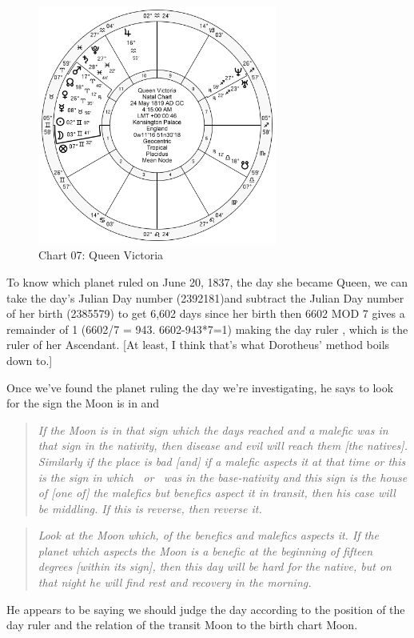 \begin{figure}[H]
\centering
\includegraphics[width=0.7\textwidth]{charts/Victoria.png}
\caption{Chart 07: Queen Victoria}
\end{figure}

To know which planet ruled on June 20, 1837, the day she became Queen, we can take the day's Julian Day number (2392181)\footnotemark[1] and subtract the Julian Day number of her birth (2385579) to get 6,602 days since her birth then 6602 MOD 7 gives a remainder of 1 (6602/7 = 943. 6602-943*7=1) making the day ruler \Mercury, which is the ruler of her Ascendant. [At least, I think that's what Dorotheus' method boils down to.]


Once we've found the planet ruling the day we're investigating, he says to look for the sign the Moon is in and
\begin{quote}
\textsl{If the Moon is in that sign which the days reached and a malefic was in that sign in the nativity, then disease and evil will reach them [the natives]. Similarly if the place is bad [and] if a malefic aspects it at that time or this is the sign in which \Saturn\, or \Mars\, was in the base-nativity and this sign is the house of [one of] the malefics but benefics aspect it in transit, then his case will be middling. If this is reverse, then reverse it.}
\end{quote} 
\begin{quote}
\textsl{Look at the Moon which, of the benefics and malefics aspects it. If the planet which aspects the Moon is a benefic at the beginning of fifteen degrees [within its sign], then this day will be hard for the native, but on that night he will find rest and recovery in the morning.
}
\end{quote}

He appears to be saying we should judge the day according to the position of the day ruler and the relation of the transit Moon to the birth chart Moon. 